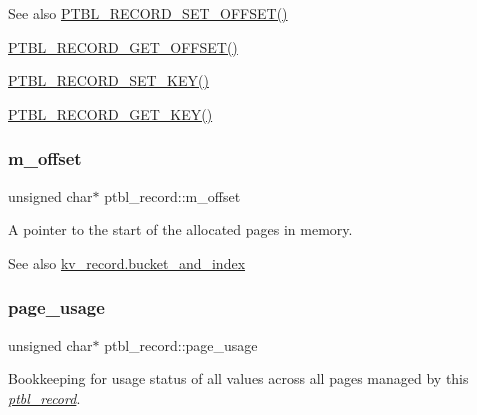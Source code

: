 \begin{DoxySeeAlso}{See also}
\mbox{\hyperlink{records_8h_afdc13ecd37c36af6dc8f095c5575cc57}{P\+T\+B\+L\+\_\+\+R\+E\+C\+O\+R\+D\+\_\+\+S\+E\+T\+\_\+\+O\+F\+F\+S\+E\+T()}} 

\mbox{\hyperlink{records_8h_ac9930081aa81ff02727b678b745d0316}{P\+T\+B\+L\+\_\+\+R\+E\+C\+O\+R\+D\+\_\+\+G\+E\+T\+\_\+\+O\+F\+F\+S\+E\+T()}} 

\mbox{\hyperlink{records_8h_ad9320ecf8a9235a6c89f644e7fbc9b38}{P\+T\+B\+L\+\_\+\+R\+E\+C\+O\+R\+D\+\_\+\+S\+E\+T\+\_\+\+K\+E\+Y()}} 

\mbox{\hyperlink{records_8h_a8e35710be790a9afaebb611c8961e902}{P\+T\+B\+L\+\_\+\+R\+E\+C\+O\+R\+D\+\_\+\+G\+E\+T\+\_\+\+K\+E\+Y()}} 
\end{DoxySeeAlso}
\mbox{\label{structptbl__record_acec45fcdf4427d3a1b62c84973d5f484}} 
\subsubsection{\texorpdfstring{m\+\_\+offset}{m\_offset}}
{\footnotesize\ttfamily unsigned char$\ast$ ptbl\+\_\+record\+::m\+\_\+offset}



A pointer to the start of the allocated pages in memory. 

\begin{DoxySeeAlso}{See also}
\mbox{\hyperlink{structkv__record_aa6e3c994316398afea8be6a05094f5b0}{kv\+\_\+record.\+bucket\+\_\+and\+\_\+index}} 
\end{DoxySeeAlso}
\mbox{\label{structptbl__record_aa2164881b8f812e973541c819152a8fe}} 
\subsubsection{\texorpdfstring{page\+\_\+usage}{page\_usage}}
{\footnotesize\ttfamily unsigned char$\ast$ ptbl\+\_\+record\+::page\+\_\+usage}



Bookkeeping for usage status of all values across all pages managed by this {\itshape \mbox{\hyperlink{structptbl__record}{ptbl\+\_\+record}}}. 

